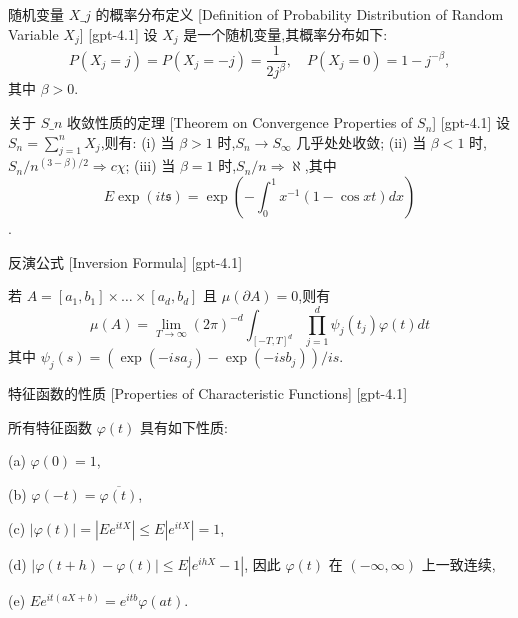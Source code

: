\documentclass[UTF8]{ctexart}
\begin{document}
    
    
    \begin{dfn}
        {随机变量 $X\_j$ 的概率分布定义}
        [Definition of Probability Distribution of Random Variable $X_j$]
        [gpt-4.1]
        设 $X_j$ 是一个随机变量,其概率分布如下:
\[
P(X_j = j) = P(X_j = -j) = \frac{1}{2j^{\beta}}, \quad P(X_j = 0) = 1 - j^{-\beta},
\]
其中 $\beta > 0$.
    \end{dfn}
    
    
    
    \begin{thm}
        {关于 $S\_n$ 收敛性质的定理}
        [Theorem on Convergence Properties of $S_n$]
        [gpt-4.1]
        设 $S_n = \sum_{j=1}^n X_j$,则有:
(i) 当 $\beta > 1$ 时,$S_n \to S_\infty$ 几乎处处收敛;
(ii) 当 $\beta < 1$ 时,$S_n / n^{(3-\beta)/2} \Rightarrow c \chi$;
(iii) 当 $\beta = 1$ 时,$S_n / n \Rightarrow \aleph$,其中
\[
E \exp(i t \mathfrak{s}) = \exp\left(-\int_{0}^{1} x^{-1}(1-\cos xt) dx\right)
\]
.
    \end{thm}
    
    
    
    \begin{thm}
        {反演公式}
        [Inversion Formula]
        [gpt-4.1]
        
若 $A = [ a _ { 1 } , b _ { 1 } ] \times \ldots \times [ a _ { d } , b _ { d } ]$ 且 $\mu ( \partial A ) = 0$,则有
\[
\mu ( A ) = \lim_{T \to \infty} ( 2 \pi ) ^ { - d } \int _ { [ - T , T ] ^ { d } } \prod _ { j = 1 } ^ { d } \psi _ { j } ( t _ { j } ) \varphi ( t ) d t
\]
其中 $\psi _ { j } ( s ) = ( \exp ( - i s a _ { j } ) - \exp ( - i s b _ { j } ) ) / i s$.

    \end{thm}
    
    
    
    \begin{thm}
        {特征函数的性质}
        [Properties of Characteristic Functions]
        [gpt-4.1]
        
所有特征函数 $\varphi(t)$ 具有如下性质:

(a) $\varphi(0) = 1$,

(b) $\varphi(-t) = \overline{\varphi(t)}$,

(c) $|\varphi(t)| = |E e^{i t X}| \leq E|e^{i t X}| = 1$,

(d) $|\varphi(t + h) - \varphi(t)| \leq E|e^{i h X} - 1|$, 因此 $\varphi(t)$ 在 $(-\infty, \infty)$ 上一致连续,

(e) $E e^{i t (a X + b)} = e^{i t b} \varphi(a t)$.

    \end{thm}
    
\end{document}
